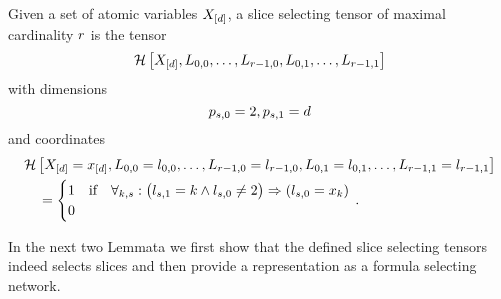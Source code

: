\begin{definition}
	Given a set of atomic variables $X_{[d]}$, a slice selecting tensor of maximal cardinality $r$ is the tensor
		\[ \mathcal{H}\left[X_{[d]},L_{0,0},\ldots,L_{r-1,0},L_{0,1},\ldots,L_{r-1,1}\right] \]
	with dimensions
		\[ p_{s,0} = 2, p_{s,1} = d \]
	and coordinates
	\begin{align*}
		& \mathcal{H}\left[X_{[d]}=x_{[d]},L_{0,0}=l_{0,0},\ldots,L_{r-1,0}=l_{r-1,0},L_{0,1}=l_{0,1},\ldots,L_{r-1,1}=l_{r-1,1}\right] \\
		& \quad = \begin{cases}
			1 & \text{if} \quad 
			\forall_{k,s} : \big(  l_{s,1} = k \land l_{s,0} \neq 2 \big) \Rightarrow  (l_{s,0} = x_{k})  \\
			0
		\end{cases} \, . 
	\end{align*}
\end{definition}

In the next two Lemmata we first show that the defined slice selecting tensors indeed selects slices and then provide a representation as a formula selecting network.

